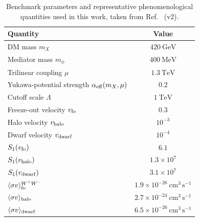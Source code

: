 \documentclass[aps,prl,twocolumn,superscriptaddress,nofootinbib]{revtex4-2}
\begin{document}
\begin{table}[t]
\centering
\caption{Benchmark parameters and representative phenomenological
quantities used in this work, taken from Ref.~\cite{Yamashita2026}
(v2).}
\label{tab:benchmark}
\begin{tabular}{lc}
\hline\hline
Quantity & Value \\
\hline
DM mass $m_X$ & $420~\mathrm{GeV}$ \\
Mediator mass $m_\phi$ & $400~\mathrm{MeV}$ \\
Trilinear coupling $\mu$ & $1.3~\mathrm{TeV}$ \\
Yukawa-potential strength $\alpha_{\rm eff}(m_X,\mu)$ & $0.2$ \\
Cutoff scale $\Lambda$ & $1~\mathrm{TeV}$ \\
\hline
Freeze-out velocity $v_{\rm fo}$ & $0.3$ \\
Halo velocity $v_{\rm halo}$ & $10^{-3}$ \\
Dwarf velocity $v_{\rm dwarf}$ & $10^{-4}$ \\
\hline
$S_1(v_{\rm fo})$ & $6.1$ \\
$S_1(v_{\rm halo})$ & $1.3\times10^{7}$ \\
$S_1(v_{\rm dwarf})$ & $3.1\times10^{7}$ \\
\hline
$\langle\sigma v\rangle_{\rm fo}^{W^+W^-}$ & $1.9\times10^{-26}~\mathrm{cm}^3\,\mathrm{s}^{-1}$ \\
$\langle\sigma v\rangle_{\rm halo}$ & $2.7\times10^{-24}~\mathrm{cm}^3\,\mathrm{s}^{-1}$ \\
$\langle\sigma v\rangle_{\rm dwarf}$ & $6.5\times10^{-26}~\mathrm{cm}^3\,\mathrm{s}^{-1}$ \\
\hline\hline
\end{tabular}
\end{table}
\end{document}
